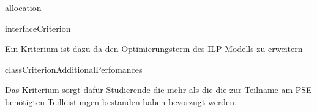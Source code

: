 \begin{texdocpackage}{allocation}
\begin{texdocclass}{interface}{Criterion}
\label{texdoclet:allocation.Criterion}
\begin{texdocclassintro}
Ein Kriterium ist dazu da den Optimierungsterm des ILP-Modells zu erweitern\end{texdocclassintro}
\begin{texdocclassmethods}
\end{texdocclassmethods}
\end{texdocclass}


\begin{texdocclass}{class}{CriterionAdditionalPerfomances}
\label{texdoclet:allocation.CriterionAdditionalPerfomances}
\begin{texdocclassintro}
Das Kriterium sorgt dafür Studierende die mehr als die die zur Teilname am PSE
 benötigten Teilleistungen bestanden haben bevorzugt werden.\end{texdocclassintro}
\begin{texdocclassconstructors}
\end{texdocclassconstructors}
\begin{texdocclassmethods}
\end{texdocclassmethods}
\end{texdocclass}



\end{texdocpackage}
